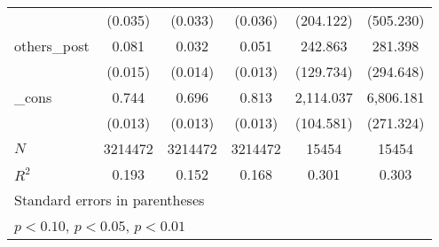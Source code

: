{\begin{tabular}{l*{5}{c}}
          &  (0.035)         &  (0.033)         &  (0.036)         &(204.122)         &(505.230)         \\
[1em]
others\_post&    0.081\sym{***}&    0.032\sym{**} &    0.051\sym{***}&  242.863\sym{*}  &  281.398         \\
          &  (0.015)         &  (0.014)         &  (0.013)         &(129.734)         &(294.648)         \\
[1em]
\_cons    &    0.744\sym{***}&    0.696\sym{***}&    0.813\sym{***}&2,114.037\sym{***}&6,806.181\sym{***}\\
          &  (0.013)         &  (0.013)         &  (0.013)         &(104.581)         &(271.324)         \\
\hline
\(N\)     &  3214472         &  3214472         &  3214472         &    15454         &    15454         \\
\(R^{2}\) &    0.193         &    0.152         &    0.168         &    0.301         &    0.303         \\
\hline\hline
\multicolumn{6}{l}{\footnotesize Standard errors in parentheses}\\
\multicolumn{6}{l}{\footnotesize \sym{*} \(p<0.10\), \sym{**} \(p<0.05\), \sym{***} \(p<0.01\)}\\
\end{tabular}
}

